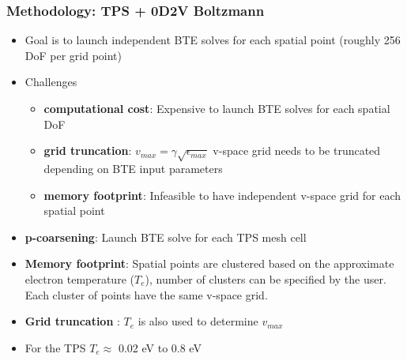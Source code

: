 \documentclass[mathserif, aspectratio=169]{beamer}
\begin{document}
\begin{frame}
	\frametitle{Methodology: TPS + 0D2V Boltzmann}
	\begin{itemize}
		\item Goal is to launch independent BTE solves for each spatial point (roughly 256 DoF per grid point)
		\item Challenges
		\begin{itemize}
			\item \textbf{computational cost}: Expensive to launch BTE solves for each spatial DoF 
			\item \textbf{grid truncation}: $v_{max} = \gamma \sqrt{\epsilon_{max}}$ v-space grid needs to be truncated depending on BTE input parameters
			\item \textbf{memory footprint}: Infeasible to have independent v-space grid for each spatial point
		\end{itemize}
		\item \textbf{p-coarsening}: Launch BTE solve for each TPS mesh cell 
		\item \textbf{Memory footprint}: Spatial points are clustered based on the approximate electron temperature ($T_e$), number of clusters can be specified by the user. Each cluster of points have the same v-space grid.
		\item \textbf{Grid truncation} : $T_e$ is also used to determine $v_{max}$
		\item For the TPS $T_e \approx$  0.02 eV to 0.8 eV
		
		
	\end{itemize}
\end{frame}
\end{document}
